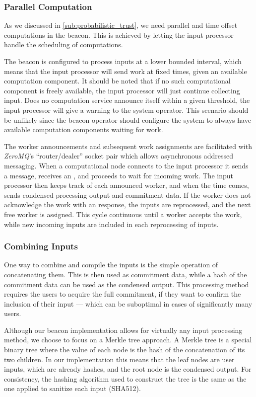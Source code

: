 \subsubsection{Parallel Computation}%
\label{ssub:parallel_computation}
As we discussed in \cref{sub:probabilistic_trust}, we need parallel and time offset computations in the beacon.
This is achieved by letting the input processor handle the scheduling of computations.

The beacon is configured to process inputs at a lower bounded interval, which means that the input processor will send work at fixed times, given an available computation component.
It should be noted that if no such computational component is freely available, the input processor will just continue collecting input.
Does no computation service announce itself within a given threshold, the input processor will give a warning to the system operator.
This scenario should be unlikely since the beacon operator should configure the system to always have available computation components waiting for work.

The worker announcements and subsequent work assignments are facilitated with \textit{ZeroMQ}'s \enquote{router/dealer} socket pair which allows asynchronous addressed messaging.
When a computational node connects to the input processor it sends a  message, receives an , and proceeds to wait for incoming work.
The input processor then keeps track of each announced worker, and when the time comes, sends condensed processing output and commitment data.
If the worker does not acknowledge the work with an  response, the inputs are reprocessed, and the next free worker is assigned.
This cycle continuous until a worker accepts the work, while new incoming inputs are included in each reprocessing of inputs.

\subsubsection{Combining Inputs}%
\label{ssub:combining_inputs}
One way to combine and compile the inputs is the simple operation of concatenating them.
This is then used as commitment data, while a hash of the commitment data can be used as the condensed output.
This processing method requires the users to acquire the full commitment, if they want to confirm the inclusion of their input --- which can be suboptimal in cases of significantly many users.

Although our beacon implementation allows for virtually any input processing method, we choose to focus on a Merkle tree approach.
A Merkle tree is a special binary tree where the value of each node is the hash of the concatenation of its two children.
In our implementation this means that the leaf nodes are user inputs, which are already hashes, and the root node is the condensed output.
For consistency, the hashing algorithm used to construct the tree is the same as the one applied to sanitize each input (SHA512).

